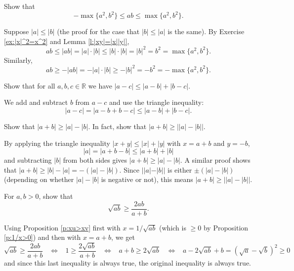 \documentclass[11pt,dvipsnames]{book}
\numberwithin{figure}{section} %
\numberwithin{table}{section} %
\begin{document}
\begin{exercise}
Show that
\[
-\max\{a^2,b^2\}\leq ab\leq \max\{a^2,b^2\}.
\]

\begin{solution}
Suppose $|a|\leq |b|$ (the proof for the case that $|b|\leq |a|$ is the same).
By Exercise \ref{ex:|x|^2=x^2} and Lemma \ref{l:|xy|=|x||y|},
\[
ab\leq |ab|=|a|\cdot|b|\leq |b|\cdot |b|=|b|^2=b^2= \max\{a^2,b^2\}.
\]
Similarly,
\[
ab\geq -|ab|=-|a|\cdot |b| \geq -|b|^2=-b^2=- \max\{a^2,b^2\}.
\]

\end{solution}
\end{exercise}

\begin{exercise}
Show that for all $a,b,c\in\mathbb{R}$ we have  $|a-c|\leq |a-b|+|b-c|$.
\begin{solution}
We add and subtract $b$ from $a-c$ and use the triangle inequality:
\[
|a-c|=|a-b+b-c|\leq |a-b|+|b-c|.
\]
\end{solution}
\end{exercise}

\begin{exercise} Show that $|a+b|\geq |a|-|b|$. In fact, show that $|a+b|\geq \left||a|-|b|\right|$.
\end{exercise}

\begin{solution}
By applying the triangle inequality $|x+y|\leq |x|+|y|$ with $x=a+b$ and $y=-b$,
\[
|a|=|a+b-b|\leq |a+b|+|b|
\]
and subtracting $|b|$ from both sides gives $|a+b|\geq |a|-|b|$. A similar proof shows that $|a+b|\geq |b|-|a|=-(|a|-|b|)$. Since $||a|-|b||$ is either $\pm (|a|-|b|)$ (depending on whether $|a|-|b|$ is negative or not), this means $|a+b|\geq \left||a|-|b|\right|$.
\end{solution}

\begin{exercise} For $a,b>0$, show that
\[
\sqrt{ab}\geq \frac{2ab}{a+b}.
\]

\begin{solution}
Using Proposition \ref{p:xu>xv} first with $x=1/\sqrt{ab}$ (which is $\geq 0$ by Proposition \ref{p:1/x>0}) and then with $x=a+b$, we get
\[
\sqrt{ab}\geq \frac{2ab}{a+b} \;\; \; \Longleftrightarrow \;\;\;
1\geq \frac{2\sqrt{ab}}{a+b}
\;\; \; \Longleftrightarrow \;\;\; a+b\geq 2\sqrt{ab}
\;\; \; \Longleftrightarrow \;\;\;
a-2\sqrt{ab}+b=(\sqrt{a}-\sqrt{b})^{2}\geq 0
\]
and since this last inequality is always true, the original inequality is always true.

\end{solution}

\end{exercise}
\end{document}
